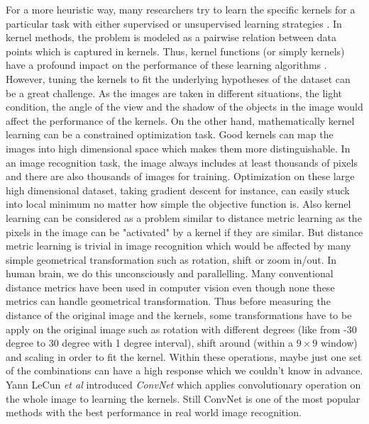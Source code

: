 For a more heuristic way, many researchers try to learn the specific kernels for a particular task with either supervised or unsupervised learning strategies \cite{Berkes:2005}\cite{SVM99}\cite{hinton06}\cite{LeCun12}\cite{LeRMDCCDN12}. In kernel methods, the problem is modeled as a pairwise relation between data points which is captured in kernels. Thus, kernel functions (or simply kernels) have a profound impact on the performance of these learning algorithms \cite{AbbasnejadRR12}. However, tuning the kernels to fit the underlying hypotheses of the dataset can be a great challenge. As the images are taken in different situations, the light condition, the angle of the view and the shadow of the objects in the image would affect the performance of the kernels. On the other hand, mathematically kernel learning can be a constrained optimization task. Good kernels can map the images into high dimensional space which makes them more distinguishable. In an image recognition task, the image always includes at least thousands of pixels and there are also thousands of images for training. Optimization on these large high dimensional dataset, taking gradient descent for instance, can easily stuck into local minimum no matter how simple the objective function is. Also kernel learning can be considered as a problem similar to distance metric learning as the pixels in the image can be "activated" by a kernel if they are similar. But distance metric learning is trivial in image recognition which would be affected by many simple geometrical transformation such as rotation, shift or zoom in/out. In human brain, we do this unconsciously and parallelling. Many conventional distance metrics have been used in computer vision even though none these metrics can handle geometrical transformation. Thus before measuring the distance of the original image and the kernels, some transformations have to be apply on the original image such as rotation with different degrees (like from -30 degree to 30 degree with 1 degree interval), shift around (within a $9\times9$ window) and scaling in order to fit the kernel. Within these operations, maybe just one set of the combinations can have a high response which we couldn't know in advance. Yann LeCun \emph{et al} introduced \emph{ConvNet} which applies convolutionary operation on the whole image to learning the kernels\cite{Yann98}. Still ConvNet is one of the most popular methods with the best performance in real world image recognition\cite{CiresanIJCAI11}\cite{RanzatoNIPS06}\cite{KrizhevskyNIPS12}.

